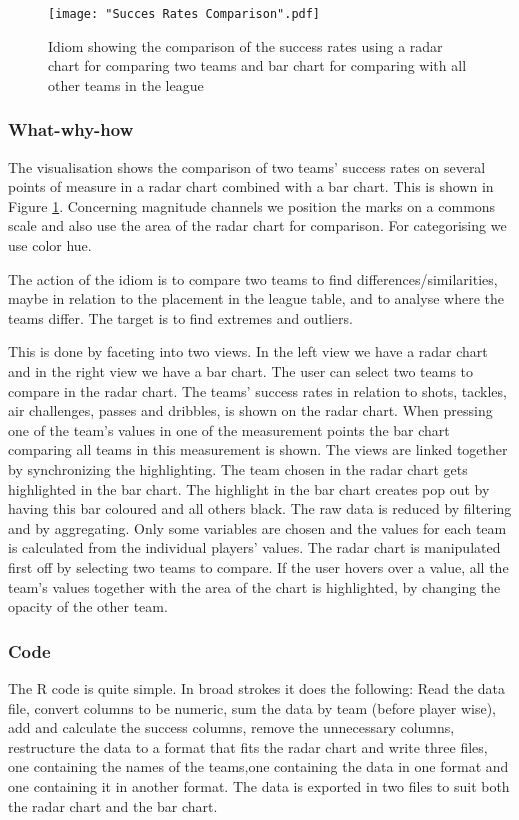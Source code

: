 \documentclass[Report.tex]{subfiles}
\begin{document}
\begin{figure}
\center
\texttt{[image: "Succes Rates Comparison".pdf]}
\caption{Idiom showing the comparison of the success rates using a radar chart for comparing two teams and bar chart for comparing with all other teams in the league}
\label{Fig:SuccesRates}
\end{figure}


\subsubsection{What-why-how}
The visualisation shows the comparison of two teams' success rates on several points of measure in a radar chart combined with a bar chart. This is shown in Figure \ref{Fig:SuccesRates}. Concerning magnitude channels we position the marks on a commons scale and also use the area of the radar chart for comparison. For categorising we use color hue.

The action of the idiom is to compare two teams to find differences/similarities, maybe in relation to the placement in the league table, and to analyse where the teams differ. The target is to find extremes and outliers.

This is done by faceting into two views. In the left view we have a radar chart and in the right view we have a bar chart. The user can select two teams to compare in the radar chart. The teams' success rates in relation to shots, tackles, air challenges, passes and dribbles, is shown on the radar chart. When pressing one of the team's values in one of the measurement points the bar chart comparing all teams in this measurement is shown. The views are linked together by synchronizing the highlighting. The team chosen in the radar chart gets highlighted in the bar chart. The highlight in the bar chart creates pop out by having this bar coloured and all others black.
The raw data is reduced by filtering and by aggregating. Only some variables are chosen and the values for each team is calculated from the individual players' values. 
The radar chart is manipulated first off by selecting two teams to compare. If the user hovers over a value, all the team's values together with the area of the chart is highlighted, by changing the opacity of the other team.
\subsubsection{Code}
The R code is quite simple. In broad strokes it does the following: Read the data file, convert columns to be numeric, sum the data by team (before player wise), add and calculate the success columns, remove the unnecessary columns, restructure the data to a format that fits the radar chart and write three files, one containing the names of the teams,one containing the data in one format and one containing it in another format. The data is exported in two files to suit both the radar chart and the bar chart.
\end{document}
